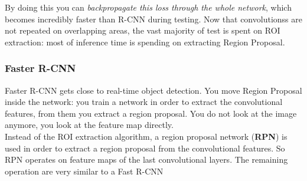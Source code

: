By doing this you can \textit{backpropagate this loss through the whole network}, which becomes incredibly faster than R-CNN during testing. Now that convolutionss are not repeated on overlapping areas, the vast majority of test is spent on ROI extraction: most of inference time is spending on extracting Region Proposal.

\subsubsection{Faster R-CNN}
Faster R-CNN gets close to real-time object detection. You move Region Proposal inside the network: you train a network in order to extract the convolutional features, from them you extract a region proposal. You do not look at the image anymore, you look at the feature map directly. \\ 

Instead of the ROI extraction algorithm, a region proposal network (\textbf{RPN}) is used in order to extract a region proposal from the convolutional features. So RPN operates on feature maps of the last convolutional layers. The remaining operation are very similar to a Fast R-CNN \\ 

